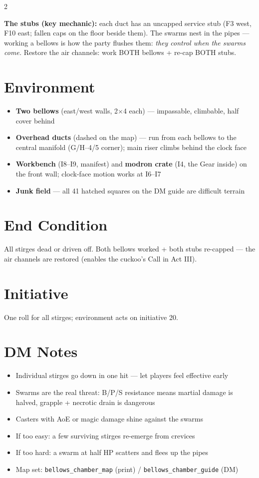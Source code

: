 \documentclass[10pt,letterpaper]{article}
\begin{document}
\begin{multicols}{2}
\vspace{4pt}

\textbf{The stubs (key mechanic):} each duct has an uncapped service stub (F3 west, F10 east; fallen caps on the floor beside them). The swarms nest in the pipes --- working a bellows is how the party flushes them: \textit{they control when the swarms come.} Restore the air channels: work BOTH bellows + re-cap BOTH stubs.

\columnbreak

\section*{Environment}
\begin{itemize}
\item \textbf{Two bellows} (east/west walls, 2$\times$4 each) --- impassable, climbable, half cover behind
\item \textbf{Overhead ducts} (dashed on the map) --- run from each bellows to the central manifold (G/H--4/5 corner); main riser climbs behind the clock face
\item \textbf{Workbench} (I8--I9, manifest) and \textbf{modron crate} (I4, the Gear inside) on the front wall; clock-face motion works at I6--I7
\item \textbf{Junk field} --- all 41 hatched squares on the DM guide are difficult terrain
\end{itemize}

\section*{End Condition}
All stirges dead or driven off. Both bellows worked + both stubs re-capped --- the air channels are restored (enables the cuckoo's Call in Act III).

\section*{Initiative}
One roll for all stirges; environment acts on initiative 20.

\section*{DM Notes}
\begin{itemize}
\item Individual stirges go down in one hit --- let players feel effective early
\item Swarms are the real threat: B/P/S resistance means martial damage is halved, grapple + necrotic drain is dangerous
\item Casters with AoE or magic damage shine against the swarms
\item If too easy: a few surviving stirges re-emerge from crevices
\item If too hard: a swarm at half HP scatters and flees up the pipes
\item Map set: \texttt{bellows\_chamber\_map} (print) / \texttt{bellows\_chamber\_guide} (DM)
\end{itemize}

\end{multicols}
\end{document}
